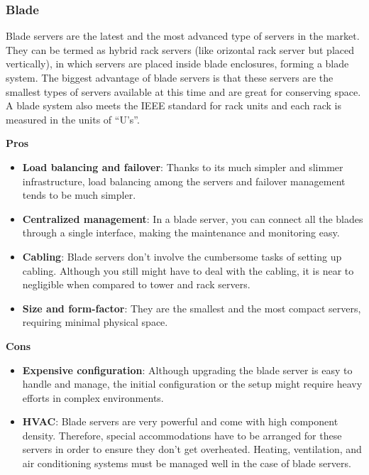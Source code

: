 \documentclass[10pt, oneside]{article}
\begin{document}
  
\subsubsection{Blade}
Blade servers are the latest and the most advanced type of servers in the market. They can be termed as hybrid rack servers (like orizontal rack server but placed vertically), in which servers are placed inside blade enclosures, forming a blade system. The biggest advantage of blade servers is that these servers are the smallest types of servers available at this time and are great for conserving space. A blade system also meets the IEEE standard for rack units and each rack is measured in the units of “U’s”.
\begin{multicols}{2}
\noindent
{\bf \color{green}Pros\color{black}}
\begin{itemize}
    \item {\bf Load balancing and failover}: Thanks to its much simpler and slimmer infrastructure, load balancing among the servers and failover management tends to be much simpler.
    \item {\bf Centralized management}: In a blade server, you can connect all the blades through a single interface, making the maintenance and monitoring easy.
    \item {\bf Cabling}: Blade servers don't involve the cumbersome tasks of setting up cabling. Although you still might have to deal with the cabling, it is near to negligible when compared to tower and rack servers.
    \item {\bf Size and form-factor}: They are the smallest and the most compact servers, requiring minimal physical space.
\end{itemize}
\columnbreak
\noindent
{\bf \color{red}Cons}\color{black}
\begin{itemize}
    \item {\bf Expensive configuration}: Although upgrading the blade server is easy to handle and manage, the initial configuration or the setup might require heavy efforts in complex environments.
    \item {\bf HVAC}: Blade servers are very powerful and come with high component density. Therefore, special accommodations have to be arranged for these servers in order to ensure they don't get overheated. Heating, ventilation, and air conditioning systems must be managed well in the case of blade servers.
\end{itemize}
\end{multicols}
\end{document}
